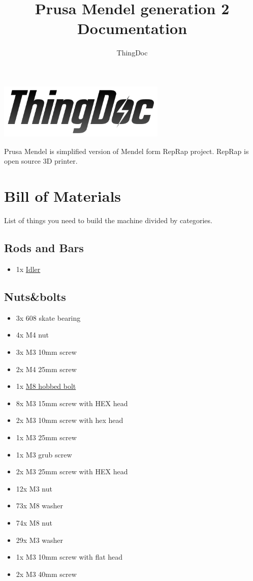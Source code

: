 \documentclass[11pt]{article}
\title{Prusa Mendel generation 2 Documentation}
\author{ThingDoc}
\begin{document}
\maketitle
\begin{center}
\includegraphics[width=8cm]{logo.png}
\end{center}
Prusa Mendel is simplified version of Mendel form RepRap project. RepRap is open source 3D printer.

\newpage

\tableofcontents

\newpage

\section{Bill of Materials}
List of things you need to build the machine divided by categories.

\subsection{Rods and Bars}
\begin{itemize}
\item 1x \hyperlink{thing_idler-m8-piece}{Idler}
\end{itemize}

\subsection{Nuts\&bolts}
\begin{itemize}
\item 3x 608 skate bearing
\item 4x M4 nut
\item 3x M3 10mm screw
\item 2x M4 25mm screw
\item 1x \hyperlink{thing_hobbed-bolt}{M8 hobbed bolt}
\item 8x M3 15mm screw with HEX head
\item 2x M3 10mm screw with hex head
\item 1x M3 25mm screw
\item 1x M3 grub screw
\item 2x M3 25mm screw with HEX head
\item 12x M3 nut
\item 73x M8 washer
\item 74x M8 nut
\item 29x M3 washer
\item 1x M3 10mm screw with flat head
\item 2x M3 40mm screw
\end{itemize}
\end{document}

